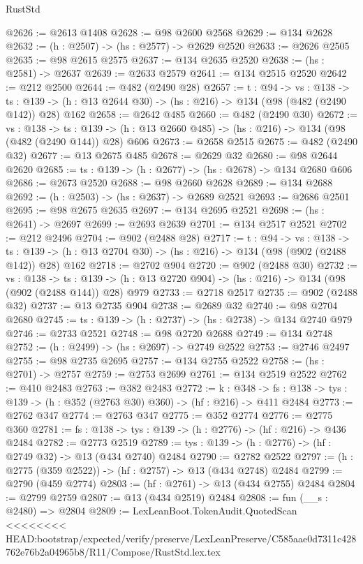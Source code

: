 \begin{lexlean}{RustStd}
\begin{coremodule}
{\begin{coremodule}
{{{{{{{{@2626 := @2613 @1408
@2628 := @98 @2600 @2568
@2629 := @134 @2628
@2632 := (h : @2507) -> (hs : @2577) -> @2629 @2520
@2633 := @2626 @2505
@2635 := @98 @2615 @2575
@2637 := @134 @2635 @2520
@2638 := (hs : @2581) -> @2637
@2639 := @2633 @2579
@2641 := @134 @2515 @2520
@2642 := @212 @2500
@2644 := @482 (@2490 @28)
@2657 := {t : @94} ->
  {vs : @138} ->
  {ts : @139} -> (h : @13 @2644 @30) -> (hs : @216) -> @134 (@98 (@482 (@2490 @142)) @28) @162
@2658 := @2642 @485
@2660 := @482 (@2490 @30)
@2672 := {vs : @138} ->
  {ts : @139} -> (h : @13 @2660 @485) -> (hs : @216) -> @134 (@98 (@482 (@2490 @144)) @28) @606
@2673 := @2658 @2515
@2675 := @482 (@2490 @32)
@2677 := @13 @2675 @485
@2678 := @2629 @32
@2680 := @98 @2644 @2620
@2685 := {ts : @139} -> (h : @2677) -> (hs : @2678) -> @134 @2680 @606
@2686 := @2673 @2520
@2688 := @98 @2660 @2628
@2689 := @134 @2688
@2692 := (h : @2503) -> (hs : @2637) -> @2689 @2521
@2693 := @2686 @2501
@2695 := @98 @2675 @2635
@2697 := @134 @2695 @2521
@2698 := (hs : @2641) -> @2697
@2699 := @2693 @2639
@2701 := @134 @2517 @2521
@2702 := @212 @2496
@2704 := @902 (@2488 @28)
@2717 := {t : @94} ->
  {vs : @138} ->
  {ts : @139} -> (h : @13 @2704 @30) -> (hs : @216) -> @134 (@98 (@902 (@2488 @142)) @28) @162
@2718 := @2702 @904
@2720 := @902 (@2488 @30)
@2732 := {vs : @138} ->
  {ts : @139} -> (h : @13 @2720 @904) -> (hs : @216) -> @134 (@98 (@902 (@2488 @144)) @28) @979
@2733 := @2718 @2517
@2735 := @902 (@2488 @32)
@2737 := @13 @2735 @904
@2738 := @2689 @32
@2740 := @98 @2704 @2680
@2745 := {ts : @139} -> (h : @2737) -> (hs : @2738) -> @134 @2740 @979
@2746 := @2733 @2521
@2748 := @98 @2720 @2688
@2749 := @134 @2748
@2752 := (h : @2499) -> (hs : @2697) -> @2749 @2522
@2753 := @2746 @2497
@2755 := @98 @2735 @2695
@2757 := @134 @2755 @2522
@2758 := (hs : @2701) -> @2757
@2759 := @2753 @2699
@2761 := @134 @2519 @2522
@2762 := @410 @2483
@2763 := @382 @2483
@2772 := {k : @348} ->
  {fs : @138} -> {tys : @139} -> (h : @352 (@2763 @30) @360) -> (hf : @216) -> @411 @2484
@2773 := @2762 @347
@2774 := @2763 @347
@2775 := @352 @2774
@2776 := @2775 @360
@2781 := {fs : @138} -> {tys : @139} -> (h : @2776) -> (hf : @216) -> @436 @2484
@2782 := @2773 @2519
@2789 := {tys : @139} -> (h : @2776) -> (hf : @2749 @32) -> @13 (@434 @2740) @2484
@2790 := @2782 @2522
@2797 := (h : @2775 (@359 @2522)) -> (hf : @2757) -> @13 (@434 @2748) @2484
@2799 := @2790 (@459 @2774)
@2803 := (hf : @2761) -> @13 (@434 @2755) @2484
@2804 := @2799 @2759
@2807 := @13 (@434 @2519) @2484
@2808 := fun (__s : @2480) => @2804
@2809 := LexLeanBoot.TokenAudit.QuotedScan
<<<<<<<< HEAD:bootstrap/expected/verify/preserve/LexLeanPreserve/C585aae0d7311c428762e76b2a04965b8/R11/Compose/RustStd.lex.tex
}}}}}}}}
\end{coremodule}}
\end{coremodule}
\end{lexlean}
